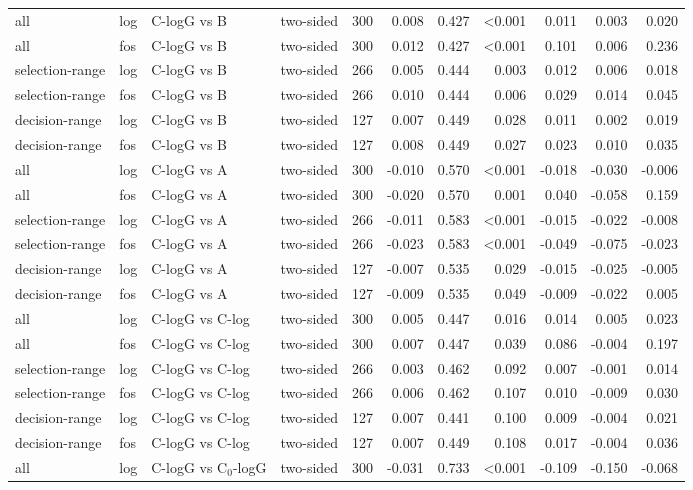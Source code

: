 \begin{longtable}{llllrrrrrrr}
all & log & C-logG vs B & two-sided & 300 & 0.008 & 0.427 & <0.001 & 0.011 & 0.003 & 0.020 \\
all & fos & C-logG vs B & two-sided & 300 & 0.012 & 0.427 & <0.001 & 0.101 & 0.006 & 0.236 \\
selection-range & log & C-logG vs B & two-sided & 266 & 0.005 & 0.444 & 0.003 & 0.012 & 0.006 & 0.018 \\
selection-range & fos & C-logG vs B & two-sided & 266 & 0.010 & 0.444 & 0.006 & 0.029 & 0.014 & 0.045 \\
decision-range & log & C-logG vs B & two-sided & 127 & 0.007 & 0.449 & 0.028 & 0.011 & 0.002 & 0.019 \\
decision-range & fos & C-logG vs B & two-sided & 127 & 0.008 & 0.449 & 0.027 & 0.023 & 0.010 & 0.035 \\
all & log & C-logG vs A & two-sided & 300 & -0.010 & 0.570 & <0.001 & -0.018 & -0.030 & -0.006 \\
all & fos & C-logG vs A & two-sided & 300 & -0.020 & 0.570 & 0.001 & 0.040 & -0.058 & 0.159 \\
selection-range & log & C-logG vs A & two-sided & 266 & -0.011 & 0.583 & <0.001 & -0.015 & -0.022 & -0.008 \\
selection-range & fos & C-logG vs A & two-sided & 266 & -0.023 & 0.583 & <0.001 & -0.049 & -0.075 & -0.023 \\
decision-range & log & C-logG vs A & two-sided & 127 & -0.007 & 0.535 & 0.029 & -0.015 & -0.025 & -0.005 \\
decision-range & fos & C-logG vs A & two-sided & 127 & -0.009 & 0.535 & 0.049 & -0.009 & -0.022 & 0.005 \\
all & log & C-logG vs C-log & two-sided & 300 & 0.005 & 0.447 & 0.016 & 0.014 & 0.005 & 0.023 \\
all & fos & C-logG vs C-log & two-sided & 300 & 0.007 & 0.447 & 0.039 & 0.086 & -0.004 & 0.197 \\
selection-range & log & C-logG vs C-log & two-sided & 266 & 0.003 & 0.462 & 0.092 & 0.007 & -0.001 & 0.014 \\
selection-range & fos & C-logG vs C-log & two-sided & 266 & 0.006 & 0.462 & 0.107 & 0.010 & -0.009 & 0.030 \\
decision-range & log & C-logG vs C-log & two-sided & 127 & 0.007 & 0.441 & 0.100 & 0.009 & -0.004 & 0.021 \\
decision-range & fos & C-logG vs C-log & two-sided & 127 & 0.007 & 0.449 & 0.108 & 0.017 & -0.004 & 0.036 \\
all & log & C-logG vs C$_0$-logG & two-sided & 300 & -0.031 & 0.733 & <0.001 & -0.109 & -0.150 & -0.068 \\

\end{longtable}
